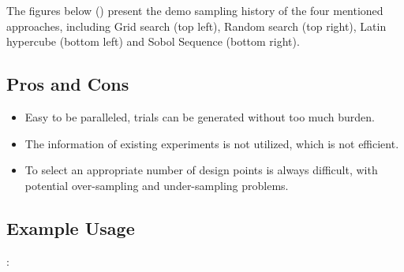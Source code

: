 \documentclass[letterpaper,10pt,english]{sphinxmanual}
\begin{document}
The figures below () present the demo sampling history of the four mentioned approaches, including Grid search (top left), Random search (top right), Latin hypercube (bottom left) and Sobol Sequence (bottom right).

   


\subsection{Pros and Cons}
\label{\detokenize{pybatdoe:pros-and-cons}}\begin{itemize}
\item {} 
Easy to be paralleled, trials can be generated without too much burden.

\item {} 
The information of existing experiments is not utilized, which is not efficient.

\item {} 
To select an appropriate number of design points is always difficult, with potential over-sampling and under-sampling problems.

\end{itemize}


\subsection{Example Usage}
\label{\detokenize{pybatdoe:example-usage}}
:
\end{document}
